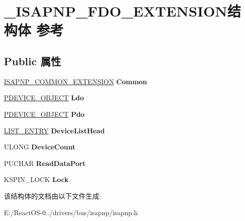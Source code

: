 \hypertarget{struct___i_s_a_p_n_p___f_d_o___e_x_t_e_n_s_i_o_n}{}\section{\+\_\+\+I\+S\+A\+P\+N\+P\+\_\+\+F\+D\+O\+\_\+\+E\+X\+T\+E\+N\+S\+I\+O\+N结构体 参考}
\label{struct___i_s_a_p_n_p___f_d_o___e_x_t_e_n_s_i_o_n}
\subsection*{Public 属性}
\begin{DoxyCompactItemize}
\item 
\mbox{\label{struct___i_s_a_p_n_p___f_d_o___e_x_t_e_n_s_i_o_n_a7067fcb3ce7c8f2566cbbd95d9451797}} 
\hyperlink{struct___i_s_a_p_n_p___c_o_m_m_o_n___e_x_t_e_n_s_i_o_n}{I\+S\+A\+P\+N\+P\+\_\+\+C\+O\+M\+M\+O\+N\+\_\+\+E\+X\+T\+E\+N\+S\+I\+ON} {\bfseries Common}
\item 
\mbox{\label{struct___i_s_a_p_n_p___f_d_o___e_x_t_e_n_s_i_o_n_a89c6cc384e71d0658e994e1e747a1cbb}} 
\hyperlink{struct___d_e_v_i_c_e___o_b_j_e_c_t}{P\+D\+E\+V\+I\+C\+E\+\_\+\+O\+B\+J\+E\+CT} {\bfseries Ldo}
\item 
\mbox{\label{struct___i_s_a_p_n_p___f_d_o___e_x_t_e_n_s_i_o_n_a390c4765cac89e5f1a739f3150af539e}} 
\hyperlink{struct___d_e_v_i_c_e___o_b_j_e_c_t}{P\+D\+E\+V\+I\+C\+E\+\_\+\+O\+B\+J\+E\+CT} {\bfseries Pdo}
\item 
\mbox{\label{struct___i_s_a_p_n_p___f_d_o___e_x_t_e_n_s_i_o_n_a1234eec776f558a16146b58c3056da38}} 
\hyperlink{struct___l_i_s_t___e_n_t_r_y}{L\+I\+S\+T\+\_\+\+E\+N\+T\+RY} {\bfseries Device\+List\+Head}
\item 
\mbox{\label{struct___i_s_a_p_n_p___f_d_o___e_x_t_e_n_s_i_o_n_a9172730f1a802d8acdb48f2935e00cf5}} 
U\+L\+O\+NG {\bfseries Device\+Count}
\item 
\mbox{\label{struct___i_s_a_p_n_p___f_d_o___e_x_t_e_n_s_i_o_n_a0a9fe1621bb89f2cb2b2db00961485bd}} 
P\+U\+C\+H\+AR {\bfseries Read\+Data\+Port}
\item 
\mbox{\label{struct___i_s_a_p_n_p___f_d_o___e_x_t_e_n_s_i_o_n_abaee1cdf611155b4271d1d10c106a4dc}} 
K\+S\+P\+I\+N\+\_\+\+L\+O\+CK {\bfseries Lock}
\end{DoxyCompactItemize}


该结构体的文档由以下文件生成\+:\begin{DoxyCompactItemize}
\item 
E\+:/\+React\+O\+S-\/0../drivers/bus/isapnp/isapnp.\+h\end{DoxyCompactItemize}
